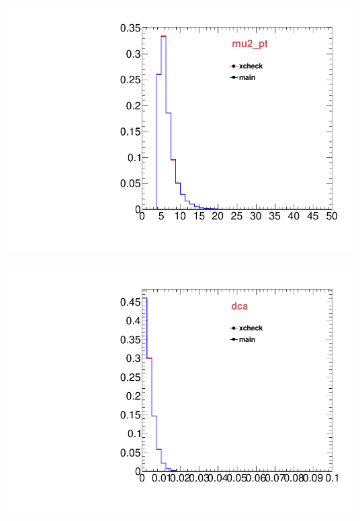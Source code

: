 \begin{figure}
\begin{subfigure}[b]{0.2\textwidth}
                \includegraphics[width=\textwidth]{Figures/VariablesComparison/MC_barrel_figs/m2pt}
                \label{fig:MC_barrel_m2pt}
        \end{subfigure}
        \begin{subfigure}[b]{0.2\textwidth}
                \centering
                \includegraphics[width=\textwidth]{Figures/VariablesComparison/MC_barrel_figs/maxdoca}
                \label{fig:MC_barrel_maxdoca}
        \end{subfigure}
        \begin{subfigure}[b]{0.2\textwidth}
                \centering

\end{subfigure}
\end{figure}
